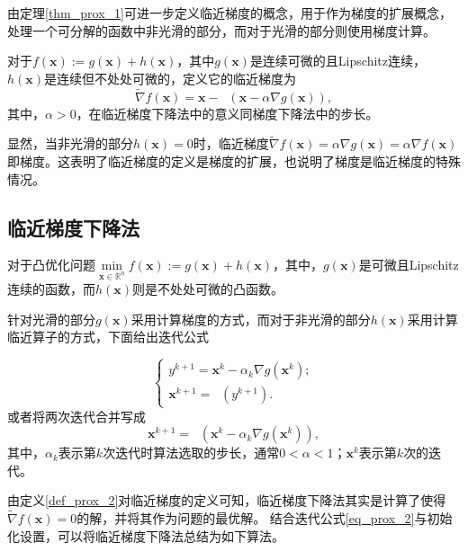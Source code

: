 由定理\ref{thm_prox_1}可进一步定义临近梯度的概念，用于作为梯度的扩展概念，处理一个可分解的函数中非光滑的部分，而对于光滑的部分则使用梯度计算。

\begin{definition}\label{def_prox_2}
    对于$f(\bm{x}) := g(\bm{x})+h(\bm{x})$，其中$g(\bm{x})$是连续可微的且Lipschitz连续，$h(\bm{x})$是连续但不处处可微的，定义它的临近梯度为
    \begin{equation}
        \tilde{\nabla} f(\bm{x}) = \bm{x} - \mathop{\mathrm{prox_{\alpha h}}}(\bm{x}-\alpha \nabla g(\bm{x})),
    \nonumber
    \end{equation}
其中，$\alpha > 0$，在临近梯度下降法中的意义同梯度下降法中的步长。
\end{definition}
显然，当非光滑的部分$h(\bm{x})=0$时，临近梯度$\tilde{\nabla} f(\bm{x})=\alpha \nabla g(\bm{x})=\alpha \nabla f(\bm{x})$即梯度。这表明了临近梯度的定义是梯度的扩展，也说明了梯度是临近梯度的特殊情况。

\subsection{临近梯度下降法}

对于凸优化问题$\min\limits_{\bm{x}\in \mathbb{R}^{n}} f(\bm{x}) := g(\bm{x}) + h(\bm{x})$，其中，$g(\bm{x})$是可微且Lipschitz连续的函数，而$h(\bm{x})$则是不处处可微的凸函数。

针对光滑的部分$g(\bm{x})$采用计算梯度的方式，而对于非光滑的部分$h(\bm{x})$采用计算临近算子的方式，下面给出迭代公式

\begin{equation}
    \begin{cases}
        y^{k+1} = \bm{x}^{k} - \alpha_{k}\nabla g(\bm{x}^{k}) ;\\
        \bm{x}^{k+1} = \mathop{\mathrm{prox_{\alpha_{k} h}}}(y^{k+1}).
    \end{cases}
    \nonumber
\end{equation}
或者将两次迭代合并写成
\begin{equation}
    \bm{x}^{k+1} = \mathop{\mathrm{prox_{\alpha_{k} h}}}(\bm{x}^{k} - \alpha_{k}\nabla g(\bm{x}^{k})),
    \label{eq_prox_2}
\end{equation}
其中，$\alpha_{k}$表示第$k$次迭代时算法选取的步长，通常$0<\alpha<1$；$\bm{x}^{k}$表示第$k$次的迭代。

由定义\ref{def_prox_2}对临近梯度的定义可知，临近梯度下降法其实是计算了使得$\tilde{\nabla} f(\bm{x})=0$的解，并将其作为问题的最优解。
结合迭代公式\ref{eq_prox_2}与初始化设置，可以将临近梯度下降法总结为如下算法。

